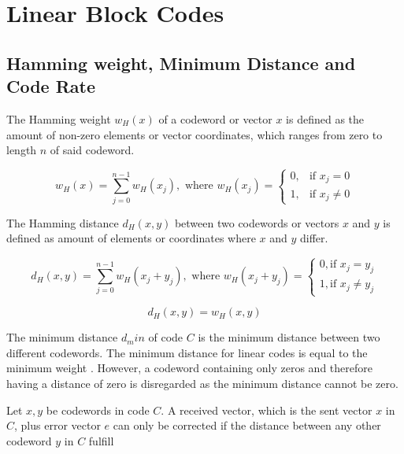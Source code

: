 \documentclass[../main.tex]{subfiles}
\begin{document}
    \chapter{Linear Block Codes}

    \section{Hamming weight, Minimum Distance and Code Rate}

    The Hamming weight $w_H(x)$ of a codeword or vector $x$ is defined as the amount of non-zero elements or vector coordinates, which ranges from zero to length $n$ of said codeword.

    \begin{equation*}
        w_H(x) = \sum_{j=0}^{n-1} w_H(x_j), \text{ where } w_H(x_j) =
        \begin{cases}
            0, &\text{if } x_j = 0 \\
            1, &\text{if } x_j \neq 0
        \end{cases}
    \end{equation*}

    \noindent
    The Hamming distance $d_H(x,y)$ between two codewords or vectors $x$ and $y$ is defined as amount of elements or coordinates where $x$ and $y$ differ.

    \begin{equation*}
        d_H(x,y) = \sum_{j=0}^{n-1} w_H(x_j+y_j), \text{ where } w_H(x_j+y_j) =
        \begin{cases}
            0, \text{if } x_j=y_j \\
            1, \text{if } x_j \neq y_j
        \end{cases}
    \end{equation*}

    \begin{equation*}
        d_H(x,y) =  w_H(x,y)
    \end{equation*}

    \noindent
    The minimum distance $d_min$ of code $C$ is the minimum distance between two different codewords. The minimum distance for linear codes is equal to the minimum weight \autocite{bossert1999channel}. However, a codeword containing only zeros and therefore having a distance of zero is disregarded as the minimum distance cannot be zero.


    Let $x,y$ be codewords in code $C$. A received vector, which is the sent vector $x$ in $C$, plus error vector $e$ can only be corrected if the distance between any other codeword $y$ in $C$ fulfill
\end{document}
